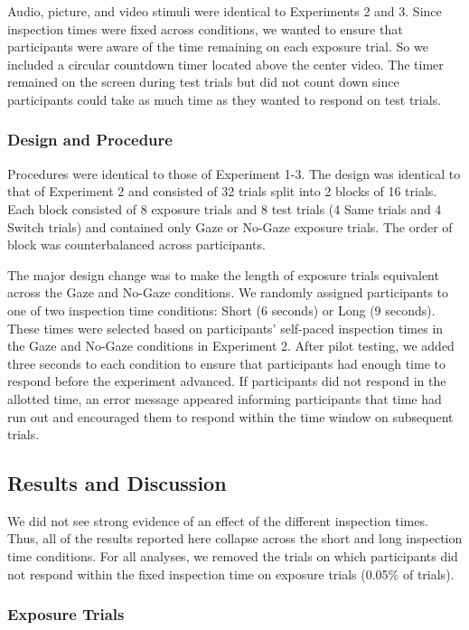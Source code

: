 \documentclass[authoryear, review]{elsarticle}
\begin{document}
Audio, picture, and video stimuli were identical to Experiments 2 and 3.
Since inspection times were fixed across conditions, we wanted to ensure
that participants were aware of the time remaining on each exposure
trial. So we included a circular countdown timer located above the
center video. The timer remained on the screen during test trials but
did not count down since participants could take as much time as they
wanted to respond on test trials.

\subsubsection{Design and Procedure}\label{design-and-procedure-3}

Procedures were identical to those of Experiment 1-3. The design was
identical to that of Experiment 2 and consisted of 32 trials split into
2 blocks of 16 trials. Each block consisted of 8 exposure trials and 8
test trials (4 Same trials and 4 Switch trials) and contained only Gaze
or No-Gaze exposure trials. The order of block was counterbalanced
across participants.

The major design change was to make the length of exposure trials
equivalent across the Gaze and No-Gaze conditions. We randomly assigned
participants to one of two inspection time conditions: Short (6 seconds)
or Long (9 seconds). These times were selected based on participants'
self-paced inspection times in the Gaze and No-Gaze conditions in
Experiment 2. After pilot testing, we added three seconds to each
condition to ensure that participants had enough time to respond before
the experiment advanced. If participants did not respond in the allotted
time, an error message appeared informing participants that time had run
out and encouraged them to respond within the time window on subsequent
trials.

\subsection{Results and Discussion}\label{results-and-discussion-3}

We did not see strong evidence of an effect of the different inspection
times. Thus, all of the results reported here collapse across the short
and long inspection time conditions. For all analyses, we removed the
trials on which participants did not respond within the fixed inspection
time on exposure trials (0.05\% of trials).

\subsubsection{Exposure Trials}\label{exposure-trials-3}
\end{document}
